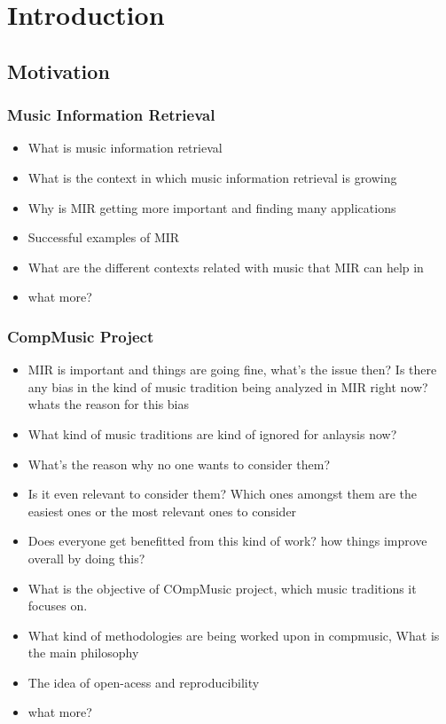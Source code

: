 
\chapter{Introduction}
\label{chap:intro}

\section{Motivation}
\label{sec:intro_motivation}

\subsection{Music Information Retrieval}
\label{sec:intro_motivation_mir}

\begin{itemize}
	\item What is music information retrieval
	\item What is the context in which music information retrieval is growing
	\item Why is MIR getting more important and finding many applications
	\item Successful examples of MIR
	\item What are the different contexts related with music that MIR can help in
	\item what more?
\end{itemize}

\subsection{CompMusic Project}
\label{sec:intro_motivation_compmusic}

\begin{itemize}
	\item MIR is important and things are going fine, what's the issue then? Is there any bias in the kind of music tradition being analyzed in MIR right now? whats the reason for this bias
	\item What kind of music traditions are kind of ignored for anlaysis now?
	\item What's the reason why no one wants to consider them?
	\item Is it even relevant to consider them? Which ones amongst them are the easiest ones or the most relevant ones to consider
	\item Does everyone get benefitted from this kind of work? how things improve overall by doing this?
	\item What is the objective of COmpMusic project, which music traditions it focuses on. 
	\item What kind of methodologies are being worked upon in compmusic, What is the main philosophy
	\item The idea of open-acess and reproducibility
	\item what more?
\end{itemize}

